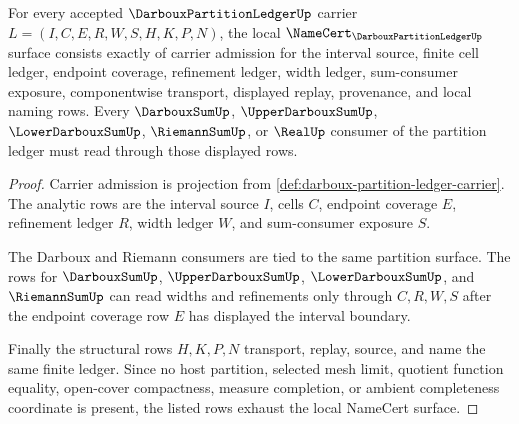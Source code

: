 \begin{theorem}
\label{thm:darboux-partition-ledger-namecert-obligations}
For every accepted $\DarbouxPartitionLedgerUp$ carrier $L=(I,C,E,R,W,S,H,K,P,N)$, the local $\NameCert_{\DarbouxPartitionLedgerUp}$ surface consists exactly of carrier admission for the interval source, finite cell ledger, endpoint coverage, refinement ledger, width ledger, sum-consumer exposure, componentwise transport, displayed replay, provenance, and local naming rows. Every $\DarbouxSumUp$, $\UpperDarbouxSumUp$, $\LowerDarbouxSumUp$, $\RiemannSumUp$, or $\RealUp$ consumer of the partition ledger must read through those displayed rows.
\end{theorem}
\begin{proof}
Carrier admission is projection from \autoref{def:darboux-partition-ledger-carrier}. The analytic rows are the interval source $I$, cells $C$, endpoint coverage $E$, refinement ledger $R$, width ledger $W$, and sum-consumer exposure $S$.

The Darboux and Riemann consumers are tied to the same partition surface. The rows for $\DarbouxSumUp$, $\UpperDarbouxSumUp$, $\LowerDarbouxSumUp$, and $\RiemannSumUp$ can read widths and refinements only through $C,R,W,S$ after the endpoint coverage row $E$ has displayed the interval boundary.

Finally the structural rows $H,K,P,N$ transport, replay, source, and name the same finite ledger. Since no host partition, selected mesh limit, quotient function equality, open-cover compactness, measure completion, or ambient completeness coordinate is present, the listed rows exhaust the local NameCert surface.
\end{proof}

